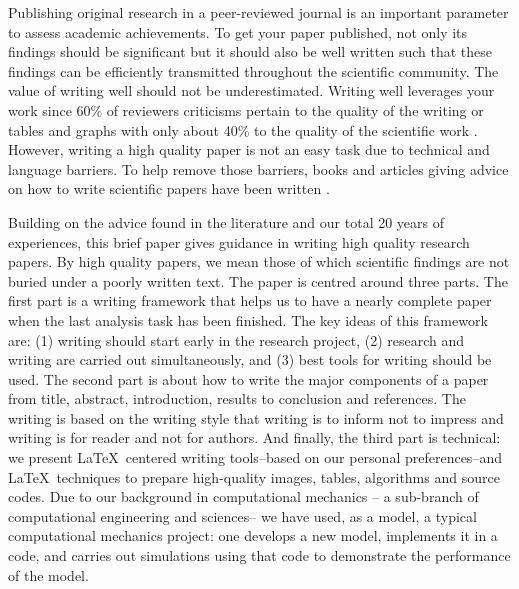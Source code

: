 \documentclass[authoryear,12pta4paper,fleqn]{article}
\numberwithin{equation}{section}
\theoremstyle{remark}
\begin{document}
Publishing original research in a peer-reviewed  journal is an important parameter to assess academic achievements. To get your paper published, not only its findings should be significant but it should also be well written such that these findings can be efficiently transmitted throughout the scientific community. The value of writing well should not be underestimated. Writing well leverages your work since 60\% of reviewers criticisms pertain to the quality of the writing or tables and graphs with only about 40\% to the quality of the scientific work \citep{iles1997guidebook}.
However, writing a high quality paper is not an easy task due to technical and language barriers. To help remove those barriers, books and articles giving advice on how to write scientific papers have been written \citep{white1972elements,day1998write,ashby2000write,plaxco2010art}. 


Building on the advice found in the literature and our total 20 years of experiences, this brief paper gives guidance in writing high quality research papers. By high quality papers, we mean those of which scientific findings are not buried under a poorly written text. The paper is centred around three parts. 
The first part is a writing framework that helps us to have a nearly complete paper when the last analysis task has been finished.  The key ideas of this framework are: (1) writing should start early in the research project, (2) research and writing are carried out simultaneously, and (3) best tools for writing should be used.  The second part is about   how to  write the major components of a paper from title, abstract, introduction, results to conclusion and references. The writing is based on the writing style that writing is to inform not to impress and writing is for reader and not for authors. And  finally, the third part is technical:  we present \LaTeX\ centered writing tools--based on our personal preferences--and  \LaTeX\ techniques  to prepare high-quality images, tables, algorithms and source codes. Due to our background in computational mechanics -- a sub-branch of computational engineering and sciences-- we have used, as a model, a typical computational mechanics project: one develops a new model, implements it in a code, and carries out simulations using that code to demonstrate the performance of the model. 
\end{document}
